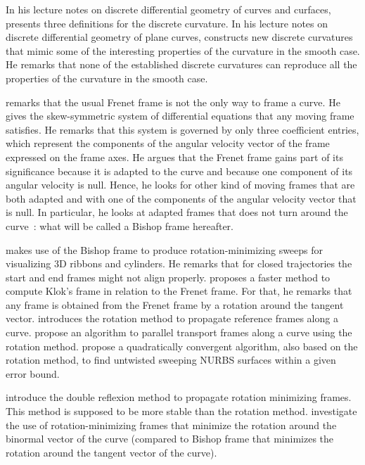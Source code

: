 In his lecture notes on discrete differential geometry of curves and curfaces,  presents three definitions for the discrete curvature. In his lecture notes on discrete differential geometry of plane curves,  constructs new discrete curvatures that mimic some of the interesting properties of the curvature in the smooth case. He remarks that none of the established discrete curvatures can reproduce all the properties of the curvature in the smooth case.

 remarks that the usual Frenet frame is not the only way to frame a curve. He gives the skew-symmetric system of differential equations that any moving frame satisfies. He remarks that this system is governed by only three coefficient entries, which represent the components of the angular velocity vector of the frame expressed on the frame axes. He argues that the Frenet frame gains part of its significance because it is adapted to the curve and because one component of its angular velocity is null. Hence, he looks for other kind of moving frames that are both adapted and with one of the components of the angular velocity vector that is null. In particular, he looks at adapted frames that does not turn around the curve~: what will be called a Bishop frame hereafter.

 makes use of the Bishop frame to produce rotation-minimizing sweeps for visualizing 3D ribbons and cylinders. He remarks that for closed trajectories the start and end frames might not align properly.  proposes a faster method to compute Klok's frame in relation to the Frenet frame. For that, he remarks that any frame is obtained from the Frenet frame by a rotation around the tangent vector.  introduces the rotation method to propagate reference frames along a curve.  propose an algorithm to parallel transport frames along a curve using the rotation method.  propose a quadratically convergent algorithm, also based on the rotation method, to find untwisted sweeping NURBS surfaces within a given error bound. 

 introduce the double reflexion method to propagate rotation minimizing frames. This method is supposed to be more stable than the rotation method.  investigate the use of rotation-minimizing frames that minimize the rotation around the binormal vector of the curve (compared to Bishop frame that minimizes the rotation around the tangent vector of the curve).



